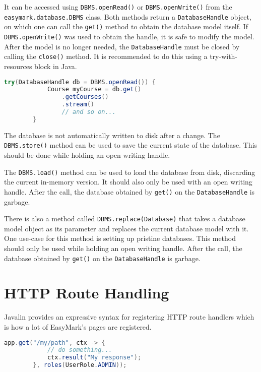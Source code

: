 \documentclass[12pt,a4paper]{report}
\begin{document}
	It can be accessed using \lstinline|DBMS.openRead()| or \lstinline|DBMS.openWrite()| from the \linebreak\lstinline|easymark.database.DBMS| class. Both methods return a \lstinline|DatabaseHandle| object, on which one can call the \lstinline|get()| method to obtain the database model itself. If \lstinline|DBMS.openWrite()| was used to obtain the handle, it is safe to modify the model. After the model is no longer needed, the \lstinline|DatabaseHandle| must be closed by calling the \lstinline|close()| method. It is recommended to do this using a try-with-resources block in Java.
	
	\begin{lstlisting}[language=Java]
		try(DatabaseHandle db = DBMS.openRead()) {
			Course myCourse = db.get()
				.getCourses()
				.stream()
				// and so on...
		}
	\end{lstlisting}

	The database is not automatically written to disk after a change. The \lstinline|DBMS.store()| method can be used to save the current state of the database. This should be done while holding an open writing handle.
	
	The \lstinline|DBMS.load()| method can be used to load the database from disk, discarding the current in-memory version. It should also only be used with an open writing handle. After the call, the database obtained by \lstinline|get()| on the \lstinline|DatabaseHandle| is garbage.
	
	There is also a method called \lstinline|DBMS.replace(Database)| that takes a database model object as its parameter and replaces the current database model with it. One use-case for this method is setting up pristine databases. This method should only be used while holding an open writing handle. After the call, the database obtained by \lstinline|get()| on the \lstinline|DatabaseHandle| is garbage.
	
	\section{HTTP Route Handling}
	Javalin provides an expressive syntax for registering HTTP route handlers which is how a lot of EasyMark's pages are registered.
	
	\begin{lstlisting}[language=Java]
		app.get("/my/path", ctx -> {
			// do something...
			ctx.result("My response");
		}, roles(UserRole.ADMIN));
	\end{lstlisting}
\end{document}
